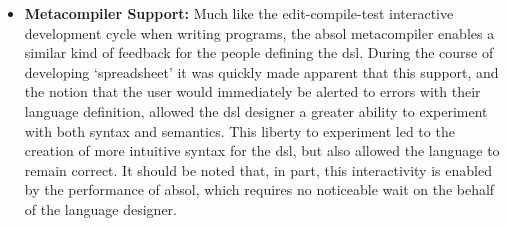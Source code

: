 \begin{itemize}
    \item \textbf{Metacompiler Support:} Much like the edit-compile-test interactive development cycle when writing programs, the \gls{absol} metacompiler enables a similar kind of feedback for the people defining the \gls{dsl}.
    During the course of developing `spreadsheet' it was quickly made apparent that this support, and the notion that the user would immediately be alerted to errors with their language definition, allowed the \gls{dsl} designer a greater ability to experiment with both syntax and semantics.
    This liberty to experiment led to the creation of more intuitive syntax for the \gls{dsl}, but also allowed the language to remain correct.
    It should be noted that, in part, this interactivity is enabled by the performance of \gls{absol}, which requires no noticeable wait on the behalf of the language designer. 
\end{itemize}



